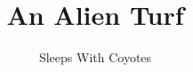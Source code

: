 \documentclass[ebook,12pt,oneside,onecolumn,openright,showtrim]{memoir}
\title{An Alien Turf}
\author{Sleeps With Coyotes}
\date{}
\begin{document}
\frontmatter
\begin{titlingpage}
\setlength{\droptitle}{80pt}
\maketitle
\end{titlingpage}

\mainmatter
\pagestyle{plain}





\backmatter
\end{document}

